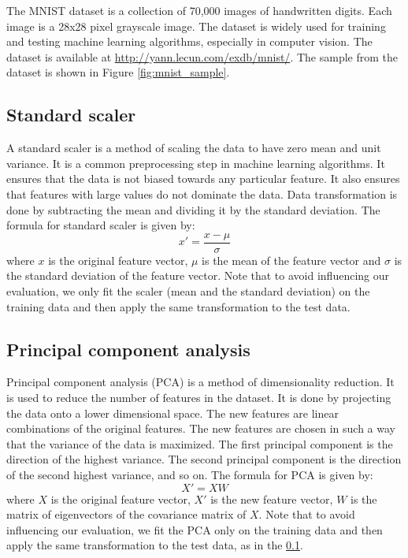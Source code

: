 \documentclass{article}
\begin{document}
The MNIST dataset is a collection of 70,000 images of handwritten digits. Each image is a 28x28 pixel grayscale image. The dataset is widely used for training and testing machine learning algorithms, especially in computer vision. The dataset is available at \url{http://yann.lecun.com/exdb/mnist/}. The sample from the dataset is shown in Figure \ref{fig:mnist_sample}.

\subsection{Standard scaler}
\label{subsec:standard_scaler}
A standard scaler is a method of scaling the data to have zero mean and unit variance. It is a common preprocessing step in machine learning algorithms. It ensures that the data is not biased towards any particular feature. It also ensures that features with large values do not dominate the data. Data transformation is done by subtracting the mean and dividing it by the standard deviation. The formula for standard scaler is given by:
\begin{equation}
    x' = \frac{x - \mu}{\sigma}
\end{equation}
where $x$ is the original feature vector, $\mu$ is the mean of the feature vector and $\sigma$ is the standard deviation of the feature vector. Note that to avoid influencing our evaluation, we only fit the scaler (mean and the standard deviation) on the training data and then apply the same transformation to the test data.

\subsection{Principal component analysis}
\label{subsec:pca}
Principal component analysis (PCA) is a method of dimensionality reduction. It is used to reduce the number of features in the dataset. It is done by projecting the data onto a lower dimensional space. The new features are linear combinations of the original features. The new features are chosen in such a way that the variance of the data is maximized. The first principal component is the direction of the highest variance. The second principal component is the direction of the second highest variance, and so on. The formula for PCA is given by:
\begin{equation}
    X' = XW
\end{equation}
where $X$ is the original feature vector, $X'$ is the new feature vector, $W$ is the matrix of eigenvectors of the covariance matrix of $X$. Note that to avoid influencing our evaluation, we fit the PCA only on the training data and then apply the same transformation to the test data, as in the \ref{subsec:standard_scaler}.
\end{document}
